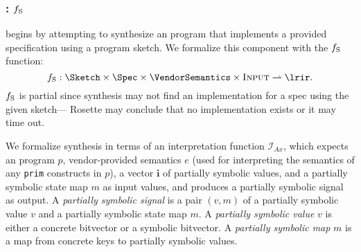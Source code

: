 
%
%
  
\subsubsection{\LRSynthesis: $f_{\text{S}{}}$}
\label{sec:lr-synth-defs}
\lrfn begins by attempting to synthesize an \lrir{} program
  that implements a provided specification using
  a program sketch.
We formalize this component with 
  the $f_{\text{S}{}}{}$ function:
  \[\LRSynthFn: \Sketch \times \Spec \times \VendorSemantics \times \textsc{Input} \rightharpoonup \lrir.\]
$f_{\text{S}{}}$ is partial since
  synthesis may not find an
  implementation for a spec
  using the given sketch---%
  Rosette may conclude that no implementation exists
  or it may time out.
  
\newcommand{\lrinterp}[0]{\mathcal{I}_{Ax}}

We formalize synthesis
  in terms of an interpretation
  function 
  $\lrinterp$,
  which expects
  an \lrir program $p$,
  vendor-provided semantics $e$ 
  (used for interpreting the
  semantics of any \texttt{prim}
  constructs in $p$),
  a vector $\mathbf{i}$ of
  partially symbolic values,
  and a partially symbolic
  state map $m$
  as input values,
  and produces a partially
  symbolic signal as output.
A \textit{partially
  symbolic signal} is a pair $(v, m)$
  of a partially symbolic value $v$
  and a partially symbolic
  state map $m$.
A \textit{partially symbolic value} $v$
  is either a concrete bitvector
  or a symbolic bitvector.
A \textit{partially symbolic map} $m$
  is a map from concrete keys
  to partially symbolic values.

